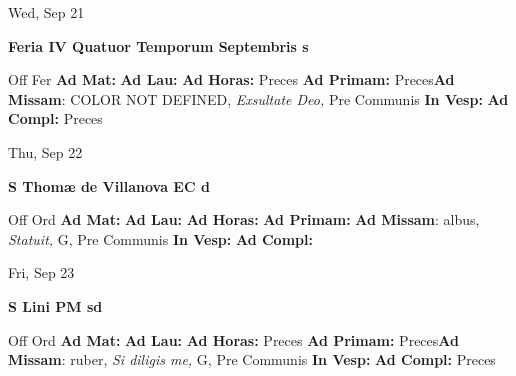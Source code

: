 \documentclass[10pt]{memoir}
\begin{document}
\begin{center}
\begin{minipage}{3.5in}
\vspace{2em}
\begin{center}Wed, Sep 21
\end{center}
\textbf{ \large Feria IV Quatuor Temporum Septembris
\textnormal{\normalsize s}}

\begin{justify}Off Fer
\textbf{Ad Mat: }
\textbf{Ad Lau: }
\textbf{Ad Horas: }Preces
\textbf{Ad Primam: }Preces\textbf{Ad Missam}: COLOR NOT DEFINED, \textit{Exsultate Deo,} Pre Communis
\textbf{In Vesp: }
\textbf{Ad Compl: }Preces
\end{justify}
\end{minipage}
\end{center}

\begin{center}
\begin{minipage}{3.5in}
\vspace{2em}
\begin{center}Thu, Sep 22
\end{center}
\textbf{ \large S Thomæ de Villanova EC
\textnormal{\normalsize d}}

\begin{justify}Off Ord
\textbf{Ad Mat: }
\textbf{Ad Lau: }
\textbf{Ad Horas: }
\textbf{Ad Primam: }\textbf{Ad Missam}: albus, \textit{Statuit,} G, Pre Communis
\textbf{In Vesp: }
\textbf{Ad Compl: }
\end{justify}
\end{minipage}
\end{center}

\begin{center}
\begin{minipage}{3.5in}
\vspace{2em}
\begin{center}Fri, Sep 23
\end{center}
\textbf{ \large S Lini PM
\textnormal{\normalsize sd}}

\begin{justify}Off Ord
\textbf{Ad Mat: }
\textbf{Ad Lau: }
\textbf{Ad Horas: }Preces
\textbf{Ad Primam: }Preces\textbf{Ad Missam}: ruber, \textit{Si diligis me,} G, Pre Communis
\textbf{In Vesp: }
\textbf{Ad Compl: }Preces
\end{justify}
\end{minipage}
\end{center}
\end{document}
